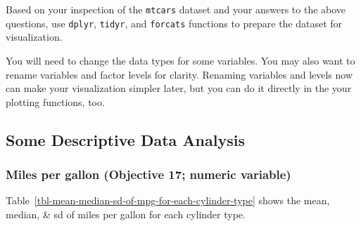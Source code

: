 \documentclass[
  man,
  floatsintext,
  longtable,
  nolmodern,
  notxfonts,
  notimes,
  colorlinks=true,linkcolor=blue,citecolor=blue,urlcolor=blue]{apa7}
\begin{document}
Based on your inspection of the \texttt{mtcars} dataset and your answers
to the above questions, use \texttt{dplyr}, \texttt{tidyr}, and
\texttt{forcats} functions to prepare the dataset for visualization.

You will need to change the data types for some variables. You may also
want to rename variables and factor levels for clarity. Renaming
variables and levels now can make your visualization simpler later, but
you can do it directly in the your plotting functions, too.

\subsection{Some Descriptive Data
Analysis}\label{some-descriptive-data-analysis}

\subsubsection{Miles per gallon (Objective 17; numeric
variable)}\label{miles-per-gallon-objective-17-numeric-variable}

Table~\ref{tbl-mean-median-sd-of-mpg-for-each-cylinder-type} shows the
mean, median, \& sd of miles per gallon for each cylinder type.
\end{document}
